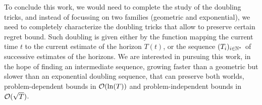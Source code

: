 To conclude this work, we would need to complete the study of the doubling tricks, and instead of focussing on two families (geometric and exponential), we need to completely characterize the doubling tricks that allow to preserve certain regret bound.
Such doubling is given either by the function mapping the current time $t$ to the current estimate of the horizon $T(t)$, or the sequence $(T_i)_{i\in\mathbb{N}^*}$ of successive estimates of the horizons.
We are interested in pursuing this work, in the hope of finding an intermediate sequence, growing faster than a geometric but slower than an exponential doubling sequence, that can preserve both worlds, problem-dependent bounds in $\mathcal{O}(\ln(T))$ and problem-independent bounds in $\mathcal{O}(\sqrt{T})$.
